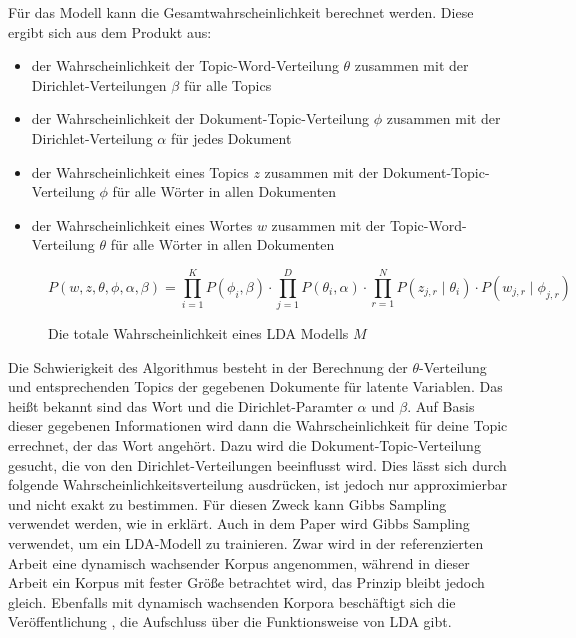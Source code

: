 \documentclass[german,version-2020-11]{uzl-thesis}
\begin{document}
Für das Modell kann die Gesamtwahrscheinlichkeit berechnet werden. Diese ergibt sich aus dem Produkt aus: 
\begin{itemize}
\item der Wahrscheinlichkeit der Topic-Word-Verteilung $\theta$ zusammen mit der Dirichlet-Verteilungen $\beta$ für alle Topics
\item der Wahrscheinlichkeit der Dokument-Topic-Verteilung $\phi$ zusammen mit der Dirichlet-Verteilung $\alpha$ für jedes Dokument
\item der Wahrscheinlichkeit eines Topics $z$ zusammen mit der Dokument-Topic-Verteilung $\phi$ für alle Wörter in allen Dokumenten
\item der Wahrscheinlichkeit eines Wortes $w$ zusammen mit der Topic-Word-Verteilung $\theta$ für alle Wörter in allen Dokumenten
\end{itemize}

\begin{figure}[h]
\begin{center}
\begin{equation}
P(w,z,\theta, \phi, \alpha, \beta) = \prod_{i=1}^{K} P(\phi_i, \beta) \cdot \prod_{j=1}^{D}P(\theta_i, \alpha) \cdot \prod_{r=1}^{N} P(z_{j,r}\mid\theta_i) \cdot P(w_{j,r} \mid \phi_{j,r}) 
\end{equation}
\end{center}
\caption{Die totale Wahrscheinlichkeit eines LDA Modells $M$}
\label{fig:equ1}
\end{figure}


Die Schwierigkeit des Algorithmus besteht in der Berechnung der $\theta$-Verteilung und entsprechenden Topics der gegebenen Dokumente für latente Variablen. Das heißt bekannt sind das Wort und die Dirichlet-Paramter $\alpha$ und $\beta$. Auf Basis dieser gegebenen Informationen wird dann die Wahrscheinlichkeit für deine Topic errechnet, der das Wort angehört. Dazu wird die Dokument-Topic-Verteilung gesucht, die von den Dirichlet-Verteilungen beeinflusst wird. Dies lässt sich durch folgende Wahrscheinlichkeitsverteilung ausdrücken, ist jedoch nur approximierbar und nicht exakt zu bestimmen. Für diesen Zweck kann Gibbs Sampling verwendet werden, wie in \cite{lda2} erklärt. Auch in dem Paper \cite{magnus} wird Gibbs Sampling verwendet, um ein LDA-Modell zu trainieren. Zwar wird in der referenzierten Arbeit eine dynamisch wachsender Korpus angenommen, während in dieser Arbeit ein Korpus mit fester Größe betrachtet wird, das Prinzip bleibt jedoch gleich. Ebenfalls mit dynamisch wachsenden Korpora beschäftigt sich die Veröffentlichung \cite{KuhBeBrMo20b}, die Aufschluss über die Funktionsweise von LDA gibt.\\
\end{document}
